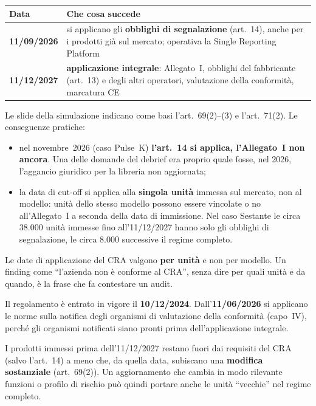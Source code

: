 \begin{center}
\small
\begin{tabularx}{\linewidth}{>{\raggedright\arraybackslash}p{3cm} X}
\toprule
\textbf{Data} & \textbf{Che cosa succede}\\
\midrule
\textbf{11/09/2026} & si applicano gli \textbf{obblighi di segnalazione} (art.~14), anche per i prodotti
  già sul mercato; operativa la Single Reporting Platform\\
\textbf{11/12/2027} & \textbf{applicazione integrale}: Allegato~I, obblighi del fabbricante (art.~13) e degli
  altri operatori, valutazione della conformità, marcatura CE\\
\bottomrule
\end{tabularx}
\end{center}
Le slide della simulazione indicano come basi l'art.~69(2)--(3) e l'art.~71(2). Le conseguenze pratiche:
\begin{itemize}
  \item nel novembre~2026 (caso Pulse~K) \textbf{l'art.~14 si applica, l'Allegato~I non ancora}. Una delle
    domande del debrief era proprio quale fosse, nel 2026, l'aggancio giuridico per la libreria non
    aggiornata;
  \item la data di cut-off si applica alla \textbf{singola unità} immessa sul mercato, non al modello:
    unità dello stesso modello possono essere vincolate o no all'Allegato~I a seconda della data di
    immissione. Nel caso Sestante le circa 38.000 unità immesse fino all'11/12/2027 hanno solo gli
    obblighi di segnalazione, le circa 8.000 successive il regime completo.
\end{itemize}

\begin{esame}
Le date di applicazione del CRA valgono \textbf{per unità} e non per modello. Un finding come ``l'azienda
non è conforme al CRA'', senza dire per quali unità e da quando, è la frase che fa contestare un audit.
\end{esame}

\begin{integrazione}
Il regolamento è entrato in vigore il \textbf{10/12/2024}. Dall'\textbf{11/06/2026} si applicano le
norme sulla notifica degli organismi di valutazione della conformità (capo~IV), perché gli organismi
notificati siano pronti prima dell'applicazione integrale.
\end{integrazione}

\begin{integrazione}
I prodotti immessi prima dell'11/12/2027 restano fuori dai requisiti del CRA (salvo l'art.~14) a meno
che, da quella data, subiscano una \textbf{modifica sostanziale} (art.~69(2)). Un aggiornamento che cambia
in modo rilevante funzioni o profilo di rischio può quindi portare anche le unità ``vecchie'' nel regime
completo.
\end{integrazione}

